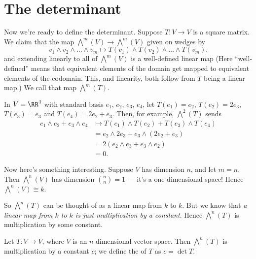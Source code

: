\section{The determinant}

Now we're ready to define the determinant.
Suppose $T \colon V \to V$ is a square matrix.
We claim that the map $\bigwedge^m(V) \to \bigwedge^m(V)$ given on wedges by
\[ v_1 \wedge v_2 \wedge \dots \wedge v_m
	\mapsto T(v_1) \wedge T(v_2) \wedge \dots \wedge T(v_m). \]
and extending linearly to all of $\bigwedge^m(V)$ is a
well-defined  linear map
(Here ``well-defined'' means that equivalent elements of the domain
get mapped to equivalent elements of the codomain.
This, and linearity, both follow from $T$ being a linear map.)
We call that map $\bigwedge^m(T)$.
\begin{example}
	In $V = \RR^4$ with standard basis $e_1$, $e_2$, $e_3$, $e_4$,
	let $T(e_1) = e_2$, $T(e_2) = 2e_3$, $T(e_3) = e_3$ and $T(e_4) = 2e_2 + e_3$.
	Then, for example, $\bigwedge^2(T)$ sends
	\begin{align*}
		e_1 \wedge e_2 + e_3 \wedge e_4
		&\mapsto T(e_1) \wedge T(e_2) + T(e_3) \wedge T(e_4) \\
		&= e_2 \wedge 2e_3 + e_3 \wedge (2e_2 + e_3) \\
		&= 2(e_2 \wedge e_3 + e_3 \wedge e_2) \\
		&= 0.
	\end{align*}
\end{example}

Now here's something interesting.
Suppose $V$ has dimension $n$, and let $m=n$.
Then $\bigwedge^n(V)$ has dimension $\binom nn = 1$ --- it's a one dimensional space!
Hence $\bigwedge^n(V) \cong k$.

So $\bigwedge^n(T)$ can be thought of as a linear map from $k$ to $k$.
But we know that \emph{a linear map from $k$ to $k$ is just multiplication by a constant}.
Hence $\bigwedge^n(T)$ is multiplication by some constant.
\begin{definition}
	Let $T \colon V \to V$, where $V$ is an $n$-dimensional vector space.
	Then $\bigwedge^n(T)$ is multiplication by a constant $c$;
	we define the  of $T$ as $c = \det T$.
\end{definition}

